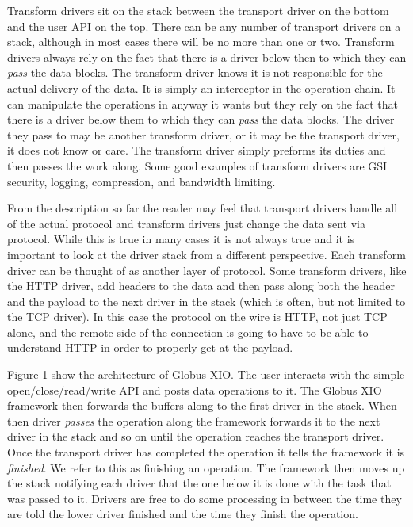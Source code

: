 \documentclass[11pt]{article}
\begin{document}
Transform drivers sit on the stack between the transport driver on the
bottom and the user API on the top.  There can be any number of transport
drivers on a stack, although in most cases there will be no more than one or 
two.  Transform drivers always rely on the fact that there is a driver
below then to which they can \emph{pass} the data blocks.  The transform
driver knows it is not responsible for the actual delivery of the data.
It is simply an interceptor in the operation chain.  It can manipulate
the operations in anyway it wants but they rely on the fact that there is
a driver below them to which they can \emph{pass} the data blocks.  The 
driver they pass to may be another transform driver, or it may be the
transport driver, it does not know or care.  The transform driver simply
preforms its duties and then passes the work along.  Some good examples
of transform drivers are GSI security, logging, compression, 
and bandwidth limiting.

From the description so far the reader may feel that transport drivers
handle all of the actual protocol and transform drivers just change the
data sent via protocol.  While this is true in many cases
it is not always true and it is important to look at the driver
stack from a different perspective.  Each transform driver can be 
thought of as another layer of protocol.  Some transform drivers, like the
HTTP driver, add headers to the data and then pass along both the
header and the payload to the next driver in the stack (which is often,
but not limited to the TCP driver).  In this case the protocol on the
wire is HTTP, not just TCP alone, and the remote side of the connection is
going to have to be able to understand HTTP in order to properly get
at the payload.

Figure 1 show the architecture of Globus XIO.  The user interacts with 
the simple open/close/read/write API and posts data operations to it.
The Globus XIO framework then forwards the buffers along to the first
driver in the stack.  When then driver \emph{passes} the operation along
the framework forwards it to the next driver in the stack and so on
until the operation reaches the transport driver.  Once the transport 
driver has completed the operation it tells the framework it is 
\emph{finished}.  We refer to this as finishing an operation.  The 
framework then moves up the stack notifying each driver that the 
one below it is done with the task that was passed to it.  Drivers
are free to do some processing in between the time they are told
the lower driver finished and the time they finish the operation.
\end{document}
